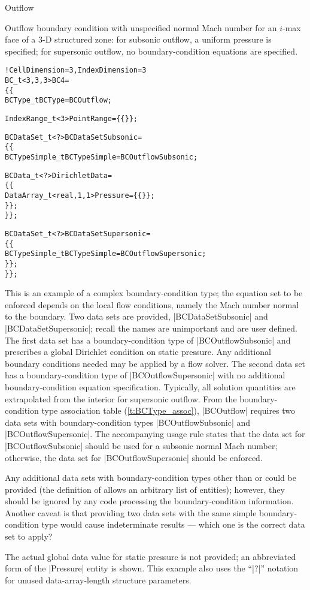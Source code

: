 \begin{example}{Outflow}
\label{ex:bc4}

Outflow boundary condition with unspecified normal Mach number for an
$i$-max face of a 3-D structured zone: for subsonic outflow, a uniform
pressure is specified; for supersonic outflow, no boundary-condition
equations are
specified.
\begin{alltt}
  !  CellDimension = 3, IndexDimension = 3
  BC\_t<3,3,3> BC4 =
    \{\{
    BCType\_t BCType = BCOutflow ;

    IndexRange\_t<3> PointRange = \{\{ \}\} ;

    BCDataSet\_t<?> BCDataSetSubsonic =
      \{\{
      BCTypeSimple\_t BCTypeSimple = BCOutflowSubsonic ;

      BCData\_t<?> DirichletData =
        \{\{
        DataArray\_t<real, 1, 1> Pressure = \{\{ \}\} ;
        \}\} ;
      \}\} ;

    BCDataSet\_t<?> BCDataSetSupersonic =
      \{\{
      BCTypeSimple\_t BCTypeSimple = BCOutflowSupersonic ;
      \}\} ;
    \}\} ;
\end{alltt}
This is an example of a complex boundary-condition type; the equation
set to be enforced depends on the local flow conditions, namely the Mach
number normal to the boundary.
Two data sets are provided, |BCDataSetSubsonic| and |BCDataSetSupersonic|;
recall the names are unimportant and are user defined.
The first data set has a boundary-condition type of |BCOutflowSubsonic|
and prescribes a global Dirichlet condition on static pressure.
Any additional boundary conditions needed may be applied by a flow solver.
The second data set has a boundary-condition type of |BCOutflowSupersonic|
with no additional boundary-condition equation specification.
Typically, all solution quantities are extrapolated from the interior for
supersonic outflow.
From the boundary-condition type association table
(\autoref{t:BCType_assoc}), |BCOutflow| requires two data sets with
boundary-condition types |BCOutflowSubsonic| and |BCOutflowSupersonic|.
The accompanying usage rule states that the data set for
|BCOutflowSubsonic| should be used for a subsonic normal Mach number;
otherwise, the data set for |BCOutflowSupersonic| should be enforced.

Any additional data sets with boundary-condition types other than
 or  could be
provided (the definition of  allows an arbitrary list of
 entities); however, they should be ignored by any
code processing the boundary-condition information.
Another caveat is that providing two data sets with the same simple
boundary-condition type would cause indeterminate results --- which one is
the correct data set to apply?

The actual global data value for static pressure is not provided; an
abbreviated form of the |Pressure| entity is shown.
This example also uses the ``|?|'' notation for unused data-array-length  
structure parameters.                                                   
\end{example}

